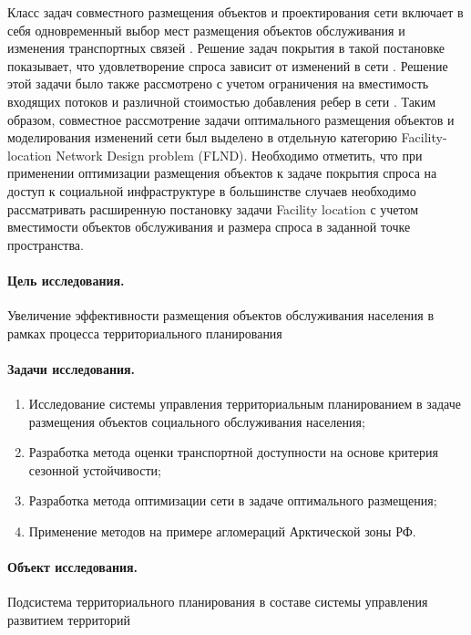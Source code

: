 \documentclass[14pt,a4paper]{extarticle}
\begin{document}
Класс задач совместного размещения объектов и проектирования сети включает в себя одновременный выбор мест размещения объектов обслуживания и изменения транспортных связей  \cite{daskin1993towardIntegrated} \cite{melkote1996integrated}. Решение задач покрытия в такой постановке показывает, что удовлетворение спроса зависит от изменений в сети \cite{melkote1998maximumCovering}. Решение этой задачи было также рассмотрено с учетом ограничения на вместимость входящих потоков и различной стоимостью добавления ребер в сети \cite{melkote2000capacitated}. Таким образом, совместное рассмотрение задачи оптимального размещения объектов и моделирования изменений сети был выделено в отдельную категорию Facility-location Network Design problem (FLND)\cite{melkote2001integrated}. Необходимо отметить, что при применении оптимизации размещения объектов к задаче покрытия спроса на доступ к социальной инфраструктуре в большинстве случаев необходимо рассматривать расширенную постановку задачи Facility location с учетом вместимости объектов обслуживания и размера спроса в заданной точке пространства.

\paragraph*{Цель исследования.}
Увеличение эффективности размещения объектов обслуживания населения в рамках процесса территориального планирования

\paragraph*{Задачи исследования.}
\begin{enumerate}
    \item Исследование системы управления территориальным планированием в задаче размещения объектов социального обслуживания населения;
    \item Разработка метода оценки транспортной доступности на основе критерия сезонной устойчивости;
    \item Разработка метода оптимизации сети в задаче оптимального размещения;
    \item Применение методов на примере агломераций Арктической зоны РФ.
\end{enumerate}

\paragraph*{Объект исследования.}
Подсистема территориального планирования в составе системы управления развитием территорий
\end{document}
